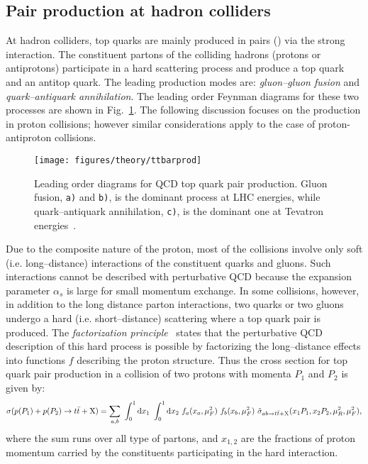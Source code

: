 \subsection{Pair production at hadron colliders}
\label{sec:topprod}

At hadron colliders, top quarks are mainly produced in pairs
(\ttbar{}) via the strong interaction. The constituent partons of the
colliding hadrons (protons or antiprotons) participate in a hard
scattering process and produce a top quark and an antitop quark. The
leading production modes are: {\it gluon--gluon fusion} and {\it
  quark--antiquark annihilation}. The leading order Feynman diagrams
for these two processes are shown in Fig.~\ref{fig:ttbarprod}. The
following discussion focuses on the \ttbar{} production in proton
collisions; however similar considerations apply to the case of
proton-antiproton collisions.

\begin{figure}[!htb]\centering
  \texttt{[image: figures/theory/ttbarprod]}
  \caption{Leading order diagrams for QCD top quark pair production.
    Gluon fusion, {\tt a)} and {\tt b)}, is the dominant process at
    LHC energies, while quark--antiquark annihilation, {\tt c)}, is
    the dominant one at Tevatron energies~\cite{Fiorini:2012fe}.} 
  \label{fig:ttbarprod}
\end{figure}

Due to the composite nature of the proton, most of the
collisions involve only soft (i.e. long--distance) interactions of the
constituent quarks and gluons. Such interactions cannot be described
with perturbative QCD because the expansion parameter $\alpha_s$ is
large for small momentum exchange.
In some collisions, however, in addition to the long distance parton
interactions, two quarks or two gluons undergo a hard (i.e. short--distance) scattering where a top quark pair is produced. 
The {\it factorization principle}~\cite{factorprinciple} states that
the perturbative QCD description of this hard process is possible by
factorizing the long--distance effects into functions $f$ describing the
proton structure. Thus the cross section for top quark pair
production in a collision of two protons with momenta $P_1$ and $P_2$
is given by: 
\begin{equation}
  \sigma(p(P_1)+p(P_2)\to t\bar{t}{}+{\rm X})
  = 
  \sum_{a,b}
  ~\int_0^1{\rm d}x_1
  ~\int_0^1{\rm d}x_2
  ~ f_a(x_a,\mu_F^2{})~f_b(x_b,\mu_F^2)
  ~\hat{\sigma}_{ab\to t\bar{t}{}+\rm{X}}(x_1P_1,x_2P_2,\mu_R^2{},\mu_F^2{}),
  \label{eq:ttbarxs}
\end{equation}
where the sum runs over all type of partons, and $x_{1,2}$ are the
fractions of proton momentum carried by the constituents participating
in the hard interaction. 

